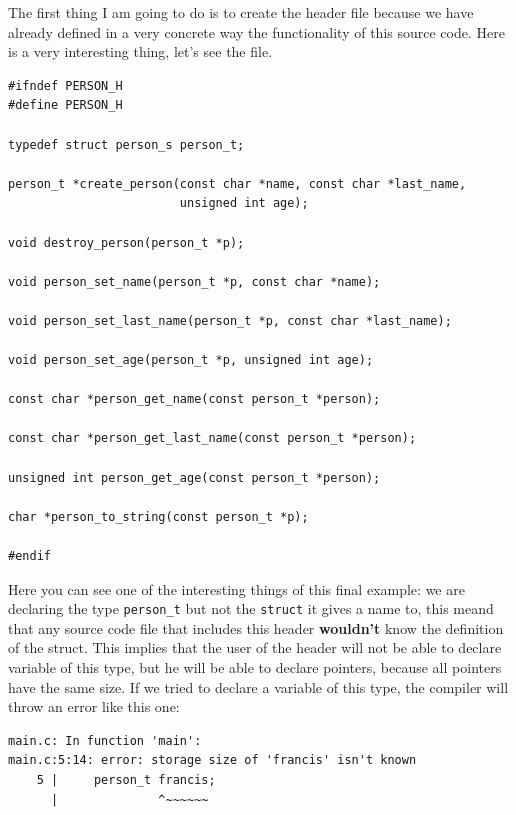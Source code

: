 \documentclass[a4paper]{article}
\begin{document}
The first thing I am going to do is to create the header file because we have
already defined in a very concrete way the functionality of this source code.
Here is a very interesting thing, let's see the file.

\noindent
\begin{minipage}[H]{\linewidth}
\mbox{}
\begin{lstlisting}[style=C,
caption={Final example of program -- \texttt{person.h}},
label={lst:finalExPerson_h}]
#ifndef PERSON_H
#define PERSON_H

typedef struct person_s person_t;

person_t *create_person(const char *name, const char *last_name,
                        unsigned int age);

void destroy_person(person_t *p);

void person_set_name(person_t *p, const char *name);

void person_set_last_name(person_t *p, const char *last_name);

void person_set_age(person_t *p, unsigned int age);

const char *person_get_name(const person_t *person);

const char *person_get_last_name(const person_t *person);

unsigned int person_get_age(const person_t *person);

char *person_to_string(const person_t *p);

#endif
\end{lstlisting}
\end{minipage}

Here you can see one of the interesting things of this final example: we are
declaring the type \verb!person_t! but not the \verb!struct! it gives a name to,
this meand that any source code file that includes this header \textbf{wouldn't}
know the definition of the struct. This implies that the user of the header
will not be able to declare variable of this type, but he will be able to
declare pointers, because all pointers have the same size. If we tried to
declare a variable of this type, the compiler will throw an error like this one:

\noindent
\begin{minipage}[H]{\linewidth}
\mbox{}
\begin{lstlisting}[style=terminalStyle]
main.c: In function 'main':
main.c:5:14: error: storage size of 'francis' isn't known
    5 |     person_t francis;
      |              ^~~~~~~
\end{lstlisting}
\end{minipage}
\end{document}
